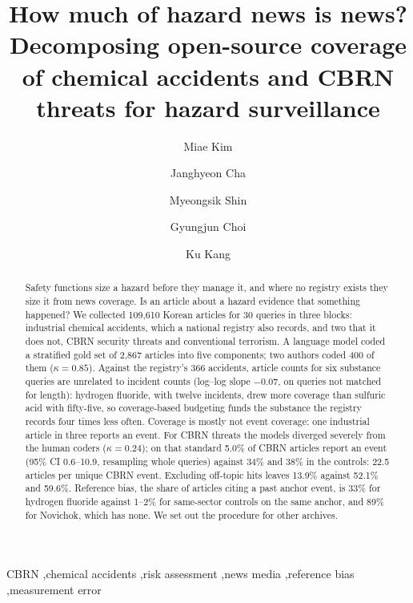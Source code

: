 \documentclass[1p,times]{elsarticle}
\begin{document}
\begin{frontmatter}

\title{How much of hazard news is news? Decomposing open-source coverage of chemical accidents and CBRN threats for hazard surveillance}

\author[cbrn]{Miae Kim}
\author[knpa]{Janghyeon Cha}
\author[cbrn]{Myeongsik Shin}
\author[cbrn]{Gyungjun Choi}
\author[cbrn]{Ku Kang}
\address[cbrn]{Chemical, Biological, Radiological and Nuclear (CBRN) Defense Research Institute, Seoul, Republic of Korea}
\address[knpa]{Korean National Police Agency, Seoul, Republic of Korea}

\begin{abstract}
Safety functions size a hazard before they manage it, and where no registry exists they size it from news coverage. Is an article about a hazard evidence that something happened? We collected 109,610 Korean articles for 30 queries in three blocks: industrial chemical accidents, which a national registry also records, and two that it does not, CBRN security threats and conventional terrorism. A language model coded a stratified gold set of 2,867 articles into five components; two authors coded 400 of them ($\kappa = 0.85$). Against the registry's 366 accidents, article counts for six substance queries are unrelated to incident counts (log--log slope $-0.07$, on queries not matched for length): hydrogen fluoride, with twelve incidents, drew more coverage than sulfuric acid with fifty-five, so coverage-based budgeting funds the substance the registry records four times less often. Coverage is mostly not event coverage: one industrial article in three reports an event. For CBRN threats the models diverged severely from the human coders ($\kappa = 0.24$); on that standard 5.0\% of CBRN articles report an event (95\% CI 0.6--10.9, resampling whole queries) against 34\% and 38\% in the controls: 22.5 articles per unique CBRN event. Excluding off-topic hits leaves 13.9\% against 52.1\% and 59.6\%. Reference bias, the share of articles citing a past anchor event, is 33\% for hydrogen fluoride against 1--2\% for same-sector controls on the same anchor, and 89\% for Novichok, which has none. We set out the procedure for other archives.
\end{abstract}

\begin{keyword}
CBRN \sep chemical accidents \sep risk assessment \sep news media \sep reference bias \sep measurement error
\end{keyword}

\end{frontmatter}
\end{document}
